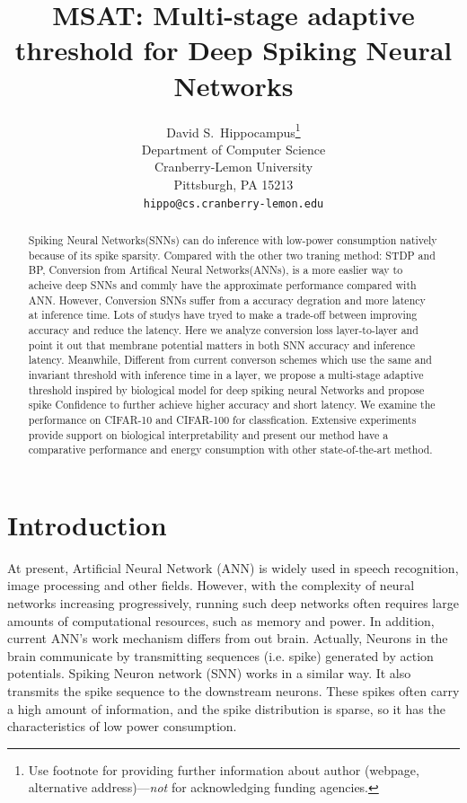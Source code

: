 \documentclass{article}
\title{MSAT: Multi-stage adaptive threshold for Deep Spiking Neural Networks}
\author{%
  David S.~Hippocampus\thanks{Use footnote for providing further information
    about author (webpage, alternative address)---\emph{not} for acknowledging
    funding agencies.} \\
  Department of Computer Science\\
  Cranberry-Lemon University\\
  Pittsburgh, PA 15213 \\
  \texttt{hippo@cs.cranberry-lemon.edu} \\
}
\begin{document}
\maketitle


\begin{abstract}
  Spiking Neural Networks(SNNs) can do inference with low-power consumption natively because of its spike sparsity.
  Compared with the other two traning method: STDP and BP, Conversion from Artifical Neural Networks(ANNs), is a more easlier way to acheive deep SNNs and commly have the approximate performance compared with ANN.
  However, Conversion SNNs suffer from a accuracy degration and more latency at inference time. Lots of studys have tryed to make a trade-off between improving accuracy and reduce the latency.
  Here we analyze conversion loss layer-to-layer and point it out that membrane potential matters in both SNN accuracy and inference latency. 
  Meanwhile, Different from current converson schemes which use the same and invariant threshold with inference time in a layer, we propose a multi-stage adaptive threshold inspired by biological model for deep spiking neural Networks and propose spike Confidence to further achieve higher accuracy and short latency.
  We examine the performance on CIFAR-10 and CIFAR-100 for classfication. 
  Extensive experiments provide support on biological interpretability and present our method have a comparative performance and energy consumption with other state-of-the-art method.
\end{abstract}


\section{Introduction}

At present, Artificial Neural Network (ANN) is widely used in speech recognition, image processing and other fields.
However, with the complexity of neural
networks increasing progressively, running such deep networks
often requires large amounts of computational resources, such
as memory and power. In addition, current ANN's work mechanism differs from out brain. Actually, Neurons in the brain communicate by transmitting sequences (i.e. spike) generated by action potentials.  
Spiking Neuron network (SNN) works in a similar way. It also transmits the spike sequence to the downstream neurons. These spikes often carry a high amount of information, and the spike distribution is sparse, so it has the characteristics of low power consumption.  
\end{document}
